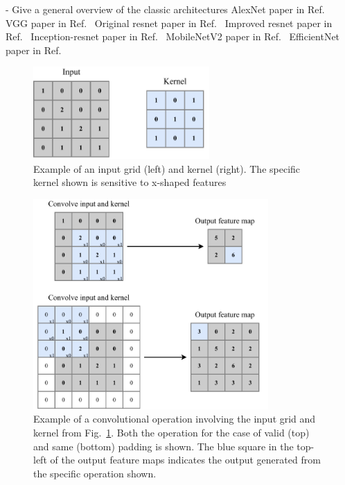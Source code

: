 - Give a general overview of the classic architectures
AlexNet paper in Ref.~\cite{krizhevsky2012}
VGG paper in Ref.~\cite{simonyan2014}
Original resnet paper in Ref.~\cite{he2016_original}
Improved resnet paper in Ref.~\cite{he2016_improved}
Inception-resnet paper in Ref.~\cite{szegedy2016}
MobileNetV2 paper in Ref.~\cite{sandler2018}
EfficientNet paper in Ref.~\cite{tan2019}

\begin{figure} %
    \includegraphics[width=0.6\textwidth]{diagrams/7-cvn/conv_input.pdf}
    \caption[Example of an input grid and kernel.]
    {Example of an input grid (left) and kernel (right). The specific kernel shown is sensitive to
        x-shaped features}
    \label{fig:conv_input}
\end{figure}

\begin{figure} %
    \includegraphics[width=0.8\textwidth]{diagrams/7-cvn/conv_operation.pdf}
    \caption[Example of convolutional operation.]
    {Example of a convolutional operation involving the input grid and kernel from
        Fig.~\ref{fig:conv_input}. Both the operation for the case of valid (top) and same (bottom)
        padding is shown. The blue square in the top-left of the output feature maps indicates the
        output generated from the specific operation shown.}
    \label{fig:conv_operation}
\end{figure}

